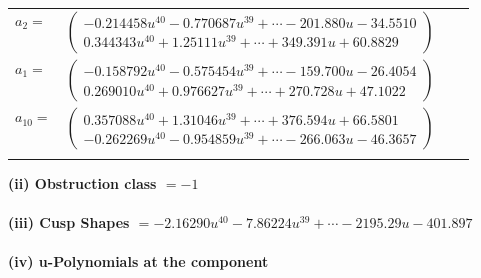 \documentclass[1p]{elsarticle_modified}
\theoremstyle{definition}
\begin{document}
\begin{tabular}{m{7pt} m{180pt} m{7pt} m{180pt} }
\flushright $a_{2}=$&$\begin{pmatrix}-0.214458 u^{40}-0.770687 u^{39}+\cdots-201.880 u-34.5510\\0.344343 u^{40}+1.25111 u^{39}+\cdots+349.391 u+60.8829\end{pmatrix}$ \\
\flushright $a_{1}=$&$\begin{pmatrix}-0.158792 u^{40}-0.575454 u^{39}+\cdots-159.700 u-26.4054\\0.269010 u^{40}+0.976627 u^{39}+\cdots+270.728 u+47.1022\end{pmatrix}$ \\
\flushright $a_{10}=$&$\begin{pmatrix}0.357088 u^{40}+1.31046 u^{39}+\cdots+376.594 u+66.5801\\-0.262269 u^{40}-0.954859 u^{39}+\cdots-266.063 u-46.3657\end{pmatrix}$\\&\end{tabular}
\flushleft \textbf{(ii) Obstruction class $= -1$}\\~\\
\flushleft \textbf{(iii) Cusp Shapes $= -2.16290 u^{40}-7.86224 u^{39}+\cdots-2195.29 u-401.897$}\\~\\
\newpage\renewcommand{\arraystretch}{1}
\flushleft \textbf{(iv) u-Polynomials at the component}\newline \\
\end{document}

